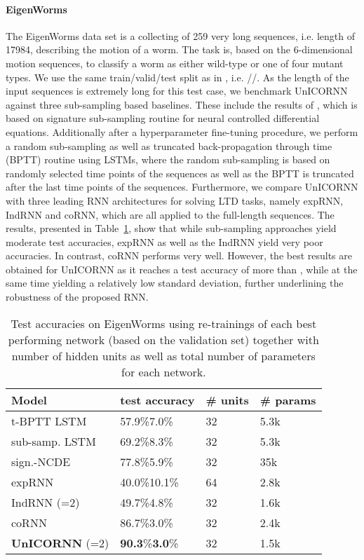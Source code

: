 \documentclass[a4paper]{article}
\newcommand{\Tref}[1]{Table~\ref{#1}}
\begin{document}
\paragraph{EigenWorms}
The EigenWorms data set \cite{eigenworms} is a collecting of 259 very long sequences, i.e. length of 17984, describing the motion of a worm. The task is, based on the 6-dimensional motion sequences, to classify a worm as either wild-type or one of four mutant types. We use the same train/valid/test split as in \cite{log_ode}, i.e. //. As the length of the input sequences is extremely long for this test case, we benchmark UnICORNN against three sub-sampling based baselines. These include the results of \cite{log_ode}, which is based on signature sub-sampling routine for neural controlled differential equations. Additionally after a hyperparameter fine-tuning procedure, we perform a random sub-sampling as well as truncated back-propagation through time (BPTT) routine using LSTMs, where the random sub-sampling is based on  randomly selected time points of the sequences as well as the BPTT is truncated after the last  time points of the sequences. Furthermore, we compare UnICORNN with three leading RNN architectures for solving LTD tasks, namely expRNN, IndRNN and coRNN, which are all applied to the full-length sequences. The results, presented in \Tref{tab:worms}, show that while sub-sampling approaches yield moderate test accuracies, expRNN as well as the IndRNN yield very poor accuracies. In contrast, coRNN performs very well. However, the best results are obtained for UnICORNN as it reaches a test accuracy of more than , while at the same time yielding a relatively low standard deviation, further underlining the robustness of the proposed RNN.
\begin{table}[h!]
\caption{Test accuracies on EigenWorms using  re-trainings of each best performing network (based on the validation set) together with number of hidden units as well as total number of parameters for each network.}
\label{tab:worms}
\centering
\begin{tabular}{llll}
\toprule
\cmidrule(r){1-4}
{ Model} &  test accuracy & \# units & { \# params} \\
\midrule
t-BPTT LSTM & 57.9\%7.0\% &32 & 5.3k\\
sub-samp. LSTM &  69.2\%8.3\% &32 & 5.3k\\
sign.-NCDE & 77.8\%5.9\% & 32 & 35k\\
\midrule
expRNN & 40.0\%10.1\% & 64 & 2.8k \\
IndRNN (=2) & 49.7\%4.8\% & 32 & 1.6k \\
coRNN & 86.7\%3.0\%&32 & 2.4k \\
\textbf{UnICORNN} (=2) & \textbf{90.3}\%\textbf{3.0}\% & 32 & 1.5k\\
    \bottomrule
  \end{tabular}
\end{table}
\end{document}
